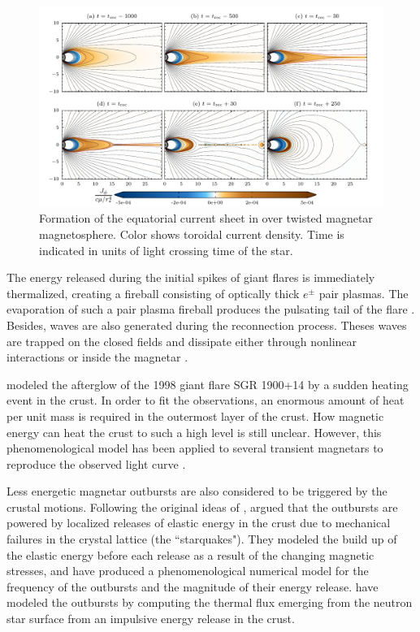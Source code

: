 \begin{figure}[h]
  \centering
  \includegraphics[width=\textwidth]{pics/intro/ffe-giant-flare.png}
  \caption[Formation of the equatorial current sheet in an over-twisted magnetar
    magnetosphere.]{Formation of the equatorial current sheet in over twisted magnetar
    magnetosphere. Color shows toroidal current density. Time is indicated in
    units of light crossing time of the star. \citep{2013ApJ...774...92P}}
  \label{fig:overtwisted-magnetar}
\end{figure}
%
The energy released during the initial spikes of giant flares is immediately thermalized, creating a fireball consisting of optically thick $e^\pm$ pair plasmas.
The evaporation of such a pair plasma fireball produces the pulsating tail of the flare  \citep{1995MNRAS.275..255T,1996ApJ...473..322T}.
Besides, \alfven waves are also generated during the reconnection process.
Theses waves are trapped on the closed fields and dissipate either through nonlinear interactions \citep{1998PhRvD..57.3219T} or inside the magnetar \citep{2015ApJ...815...25L}.

\citet{2002ApJ...580L..69L} modeled the afterglow of the 1998 giant flare SGR 1900+14 by a sudden heating event in the crust.
In order to fit the observations, an enormous amount of heat per unit mass is required in the outermost layer of the crust. 
How magnetic energy can heat the crust to such a high level is still unclear. However, this phenomenological model has been applied to several transient magnetars to reproduce the observed light curve \citep{2013ApJ...770...65R,2014ApJ...786...62S}.

Less energetic magnetar outbursts are also considered to be triggered by the crustal motions.
Following the original ideas of \citet{1996ApJ...473..322T}, \citet{2011ApJ...727L..51P} argued that the outbursts are powered by localized releases of elastic energy in the crust  due to mechanical failures in the crystal lattice (the ``starquakes"). 
They modeled the build up of the elastic energy before each release as a result of the changing magnetic stresses, and have produced a phenomenological numerical model for the frequency of the outbursts and the magnitude of their energy release.  \citet{2012ApJ...750L...6P} have modeled the outbursts by computing the thermal flux emerging from the neutron star surface from an impulsive energy release in the crust. 


